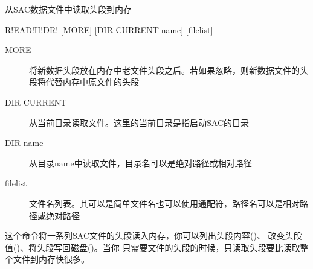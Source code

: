 \label{cmd:readhdr}

从SAC数据文件中读取头段到内存

\begin{SACSTX}
R!EAD!H!DR! [MORE] [DIR CURRENT|name] [filelist]
\end{SACSTX}

\begin{description}
\item [MORE] 将新数据头段放在内存中老文件头段之后。若如果忽略，则新数据文件的头段将代替内存中原文件的头段
\item [DIR CURRENT] 从当前目录读取文件。这里的当前目录是指启动SAC的目录
\item [DIR name] 从目录name中读取文件，目录名可以是绝对路径或相对路径
\item [filelist] 文件名列表。其可以是简单文件名也可以使用通配符，路径名可以是相对路径或绝对路径
\end{description}

这个命令将一系列SAC文件的头段读入内存，你可以列出头段内容()、
改变头段值()、将头段写回磁盘()。当你
只需要文件的头段的时候，只读取头段要比读取整个文件到内存快很多。

